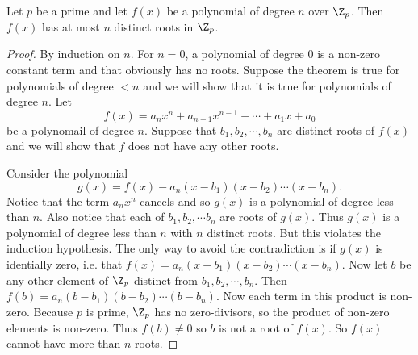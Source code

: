\documentclass[oneside,12pt]{amsart}
\begin{document}
\begin{theorem}
Let $p$ be a prime and let $f(x)$ be a polynomial of degree $n$ over $\Z_p$. Then $f(x)$ has at
most $n$ distinct roots in $\Z_p$.
\end{theorem}
\begin{proof}
By induction on $n$. For $n=0$, a polynomial of degree 0 is a non-zero constant term and that obviously has no roots.
Suppose the theorem is true for polynomials of degree $<n$ and we will show that it is true for polynomials of degree $n$. Let
$$f(x) = a_nx^n + a_{n-1}x^{n-1} + \cdots + a_1x + a_0$$
be a polynomail of degree $n$. Suppose that $b_1,b_2,\cdots, b_n$ are distinct roots of $f(x)$ and we will show that $f$ does not have
any other roots.

Consider the polynomial
$$g(x)=f(x) - a_n(x-b_1)(x-b_2)\cdots(x-b_n).$$
Notice that the term $a_n x^n$ cancels and so $g(x)$ is a polynomial of degree less than $n$. Also notice that each of $b_1,b_2,\cdots b_n$
are roots of $g(x)$. Thus $g(x)$ is a polynomial of degree less than $n$ with $n$ distinct roots. But this violates the induction hypothesis.
The only way to avoid the contradiction is if $g(x)$ is identially zero, i.e. that $f(x) = a_n(x-b_1)(x-b_2)\cdots(x-b_n)$. Now let
$b$ be any other element of $\Z_p$ distinct from $b_1,b_2,\cdots,b_n$. Then $f(b)=a_n(b-b_1)(b-b_2)\cdots(b-b_n)$. Now each
term in this product is non-zero. Because $p$ is prime, $\Z_p$ has no zero-divisors, so the product of non-zero elements is non-zero.
Thus $f(b)\not=0$ so $b$ is not a root of $f(x)$. So $f(x)$ cannot have more than $n$ roots.
\end{proof}





\end{document}
